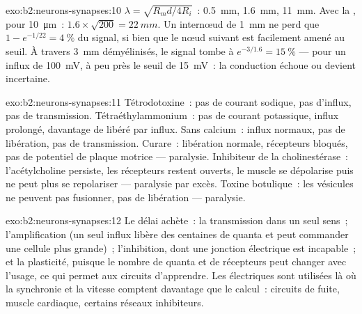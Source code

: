 \begin{solution}{exo:b2:neurons-synapses:10}
$\lambda = \sqrt{R_m d/4R_i}$~: \qty{0.5}{mm}, \qty{1.6}{mm},
\qty{11}{mm}. Avec la , pour \qty{10}{\micro m}~: $1.6\times\sqrt{200} =
\qty{22}{mm}$. Un internœud de \qty{1}{mm} ne perd que $1 - e^{-1/22}
= \qty{4}{\%}$ du signal, si bien que le nœud suivant est facilement amené
au seuil. À travers \qty{3}{mm} démyélinisés, le signal tombe à
$e^{-3/1.6} = \qty{15}{\%}$ --- pour un influx de \qty{100}{mV}, à peu
près le seuil de \qty{15}{mV}~: la conduction échoue ou devient
incertaine.
\end{solution}

\begin{solution}{exo:b2:neurons-synapses:11}
Tétrodotoxine~: pas de courant sodique, pas d'influx, pas de
transmission. Tétraéthylammonium~: pas de courant potassique, influx
prolongé, davantage de  libéré par influx. Sans
calcium~: influx normaux, pas de libération, pas de transmission.
Curare~: libération normale, récepteurs bloqués, pas de potentiel de
plaque motrice --- paralysie. Inhibiteur de la cholinestérase~:
l'acétylcholine persiste, les récepteurs restent ouverts, le muscle se
dépolarise puis ne peut plus se repolariser --- paralysie par excès.
Toxine botulique~: les vésicules ne peuvent pas fusionner, pas de
libération --- paralysie.
\end{solution}

\begin{solution}{exo:b2:neurons-synapses:12}
Le délai achète~: la transmission dans un seul sens~; l'amplification
(un seul influx libère des centaines de quanta et peut commander une
cellule plus grande)~; l'inhibition, dont une jonction électrique est
incapable~; et la plasticité, puisque le nombre de quanta et de
récepteurs peut changer avec l'usage, ce qui permet aux circuits
d'apprendre. Les  électriques sont utilisées là où la synchronie
et la vitesse comptent davantage que le calcul~: circuits de fuite,
muscle cardiaque, certains réseaux inhibiteurs.
\end{solution}

